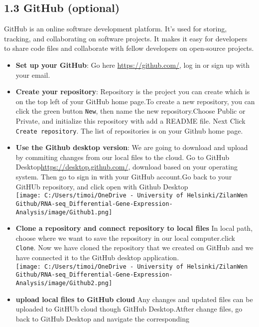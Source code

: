 \documentclass[
]{article}
\begin{document}
\subsection{1.3 GitHub (optional)}\label{github-optional}

GitHub is an online software development platform. It's used for
storing, tracking, and collaborating on software projects. It makes it
easy for developers to share code files and collaborate with fellow
developers on open-source projects.

\begin{itemize}
\item
  \textbf{Set up your GitHub}: Go here \url{https://github.com/}, log in
  or sign up with your email.
\item
  \textbf{Create your repository}: Repository is the project you can
  create which is on the top left of your GitHub home page.To create a
  new repository, you can click the green button \texttt{New}, then name
  the new repository.Choose Public or Private, and initialize this
  repository with add a README file. Next Click
  \texttt{Create\ repository}. The list of repositories is on your
  Github home page.
\item
  \textbf{Use the Github desktop version}: We are going to download and
  upload by commiting changes from our local files to the cloud. Go to
  GitHub Desktop\url{https://desktop.github.com/}, download based on
  your operating system. Then go to sign in with your GitHub account.Go
  back to your GitHUb repository, and click open with Github Desktop\\
  \texttt{[image: C:/Users/timoi/OneDrive - University of Helsinki/ZilanWen Github/RNA-seq\_Differential-Gene-Expression-Analysis/image/Github1.png]}
\item
  \textbf{Clone a repository and connect repository to local files} In
  local path, choose where we want to save the repository in our local
  computer.click \texttt{Clone}. Now we have cloned the repository that
  we created on GitHub and we have connected it to the GitHub desktop
  application.\\
  \texttt{[image: C:/Users/timoi/OneDrive - University of Helsinki/ZilanWen Github/RNA-seq\_Differential-Gene-Expression-Analysis/image/Github2.png]}
\item
  \textbf{upload local files to GitHub cloud} Any changes and updated
  files can be uploaded to GitHUb cloud though GitHub Desktop.Atfter
  change files, go back to GitHub Desktop and navigate the corresponding

\end{itemize}
\end{document}
